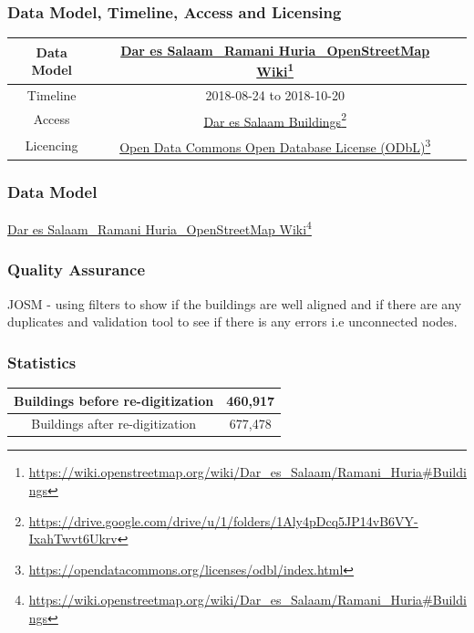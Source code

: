 \documentclass[a4paper,12pt,twoside]{article}
\begin{document}
\subsubsection{Data Model, Timeline, Access and Licensing}
\begin{center}
\begin{tabular}{|c|c|c|}  
 \hline
Data Model &
        \href{https://wiki.openstreetmap.org/wiki/Dar_es_Salaam/Ramani_Huria\#Buildings}{Dar es Salaam\_Ramani Huria\_OpenStreetMap Wiki}\footnote{\url{https://wiki.openstreetmap.org/wiki/Dar_es_Salaam/Ramani_Huria\#Buildings}} \\
 \hline
  Timeline  &  2018-08-24 to 2018-10-20 \\
\hline  
 Access  & 
    \href{https://drive.google.com/drive/u/1/folders/1Aly4pDcq5JP14vB6VY-IxahTwvt6Ukrv}{Dar es Salaam Buildings}\footnote{\url{https://drive.google.com/drive/u/1/folders/1Aly4pDcq5JP14vB6VY-IxahTwvt6Ukrv}} \\
   
\hline 
    Licencing & \href{https://opendatacommons.org/licenses/odbl/index.html}{Open Data Commons Open Database License (ODbL)}\footnote{\url{https://opendatacommons.org/licenses/odbl/index.html}} \\
\hline
\end{tabular}
\end{center}
\subsubsection{Data Model}
\href{https://wiki.openstreetmap.org/wiki/Dar_es_Salaam/Ramani_Huria\#Buildings}{Dar es Salaam\_Ramani Huria\_OpenStreetMap Wiki}\footnote{\url{https://wiki.openstreetmap.org/wiki/Dar_es_Salaam/Ramani_Huria\#Buildings}}

\subsubsection{Quality Assurance}
JOSM - using filters to show if the buildings are well aligned and if there are any duplicates and validation tool to see if there is any errors i.e unconnected nodes.

\subsubsection{Statistics}
\begin{center}
\begin{tabular}{|c|c|}
\hline
   Buildings before re-digitization & 460,917 \\
\hline
   Buildings after re-digitization & 677,478 \\
\hline
\end{tabular}
\end{center}
\end{document}
